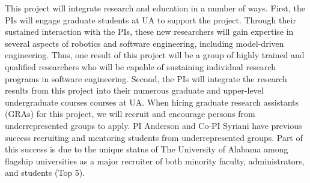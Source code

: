 This project will integrate research and education in a number of ways.
First, the PIs will engage graduate students at UA to support the project.
Through their sustained interaction with the PIs, these new researchers will gain expertise in several aspects of robotics and software engineering, including model-driven engineering.
Thus, one result of this project will be a group of highly trained and qualified researchers who will be capable of sustaining individual research programs in software engineering.
Second, the PIs will integrate the research results from this project into their numerous graduate and upper-level undergraduate courses courses at UA.
When hiring graduate research assistants (GRAs) for this project, we will recruit and encourage persons from underrepresented groups to apply.
PI Anderson and Co-PI Syriani have previous success recruiting and mentoring students from underrepresented groups.  Part of this success is due to the unique status of The University of Alabama among flagship universities as a major recruiter of both minority faculty, administrators, and students (Top 5).






